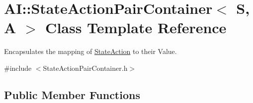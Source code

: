 \hypertarget{classAI_1_1StateActionPairContainer}{\section{A\-I\-:\-:State\-Action\-Pair\-Container$<$ S, A $>$ Class Template Reference}
\label{classAI_1_1StateActionPairContainer}
}


Encapsulates the mapping of \hyperlink{classAI_1_1StateAction}{State\-Action} to their Value.  




{\ttfamily \#include $<$State\-Action\-Pair\-Container.\-h$>$}

\subsection*{Public Member Functions}
